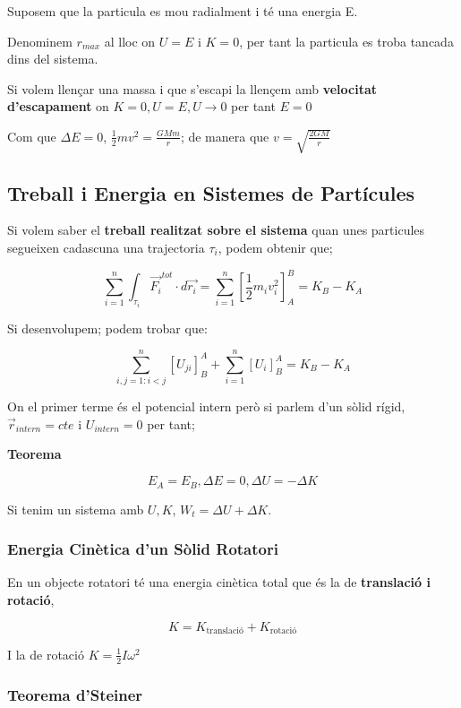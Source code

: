 \documentclass[12pt]{article}
\begin{document}
\begin{examplebox}{}
    Suposem que la particula es mou radialment i té una energia E.

    Denominem $r_{max}$ al lloc on $U = E$ i $K = 0$, per tant la particula es troba tancada dins del sistema.

    Si volem llençar una massa i que s'escapi la llençem amb \textbf{velocitat d'escapament} on $K = 0, U = E, U \rightarrow 0$ per tant $E = 0$

    Com que $\Delta E = 0$, $\frac{1}{2}mv^2 = \frac{GMm}{r}$; de manera que $v = \sqrt{\frac{2GM}{r}}$
\end{examplebox}

\subsection{Treball i Energia en Sistemes de Partícules}

Si volem saber el \textbf{treball realitzat sobre el sistema} quan unes particules segueixen cadascuna una trajectoria $\tau_i$, podem obtenir que;

\[\sum_{i = 1}^{n} \int_{\tau_i} \vec{F_i}^{tot} \cdot d\vec{r_i} = \sum_{i = 1}^{n} [\frac{1}{2} m_iv_i^2]^B_A = K_B - K_A\] 

Si desenvolupem; podem trobar que:

\[\sum_{i,j = 1: i<j}^{n} [U_{ji}]^A_B + \sum_{i=1}^{n} [U_i ]^A_B = K_B - K_A\]

On el primer terme és el potencial intern però si parlem d'un sòlid rígid, $\vec{r}_{intern} = cte$ i $U_{intern} = 0$ per tant;

\textbf{Teorema}

\[E_A = E_B , \Delta E = 0, \Delta U = - \Delta K\]

Si tenim un sistema amb $U, K$, $W_t = \Delta U + \Delta K$.

\subsubsection{Energia Cinètica d'un Sòlid Rotatori}

En un objecte rotatori té una energia cinètica total que és la de \textbf{translació i rotació}, 

\[K = K_{\text{translació}} + K_{\text{rotació}}\]

I la de rotació $K = \frac{1}{2} I \omega^2$

\subsubsection{Teorema d'Steiner}
\end{document}
